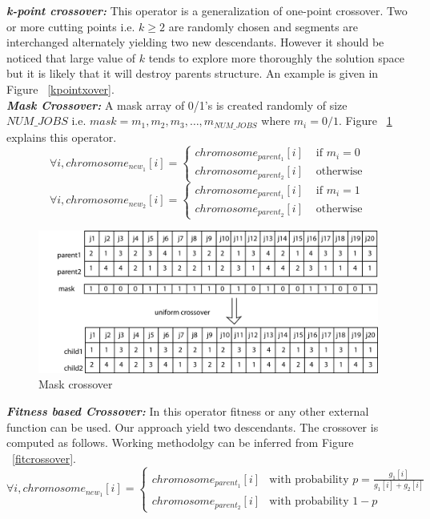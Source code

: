 \textbf{\emph{k-point crossover: }} This operator is a generalization of one-point crossover. Two or more cutting points i.e. $k \geq 2$ are randomly chosen and segments are interchanged alternately yielding two new descendants. However it should be noticed that large value of $k$ tends to explore more thoroughly the solution space but it is likely that it will destroy parents structure. An example is given in Figure ~\ref{kpointxover}.\\
\textbf{\emph{ Mask Crossover: }} A mask array of 0/1's is created randomly of size $NUM\_JOBS$ i.e. $mask = m_1,m_2,m_3,\ldots,m_{NUM\_JOBS}$ where $m_i = 0/1$. Figure ~\ref{mcrossover} explains this operator.
$$
\forall i, chromosome_{new_1}[i] = \left\{ \begin{array}{rl}
 chromosome_{parent_1}[i] &\mbox{ if $m_i = 0$} \\
 chromosome_{parent_2}[i] &\mbox{ otherwise}
       \end{array} \right.
$$
$$
\forall i, chromosome_{new_2}[i] = \left\{ \begin{array}{rl}
 chromosome_{parent_1}[i] &\mbox{ if $m_i = 1$} \\
 chromosome_{parent_2}[i] &\mbox{ otherwise}
       \end{array} \right.
$$
\begin{figure}[h]
    \centering
    \includegraphics[width=1.0\columnwidth]{crossover3}
    \caption{Mask crossover}
	\label{mcrossover}
\end{figure}
\textbf{\emph{Fitness based Crossover: }} In this operator fitness or any other external function can be used. Our approach yield two descendants. The crossover is computed as follows. Working methodolgy can be inferred from Figure ~\ref{fitcrossover}.\\
$$
\forall i, chromosome_{new_1}[i] = \left\{ \begin{array}{rl}
 chromosome_{parent_1}[i] &\mbox{with probability $p = \frac{g_1[i]}{g_1[i] +g_2[i]}$} \\
 chromosome_{parent_2}[i] &\mbox{with probability $1-p$}
       \end{array} \right.
$$
